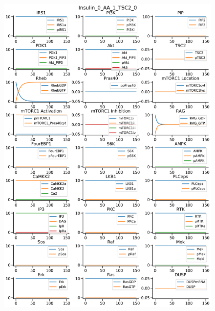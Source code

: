 \documentclass{beamer}
\begin{document}
\begin{frame}
\begin{figure}
\begin{minipage}{0.45\textwidth}
        \centering
        \includegraphics[width=\textwidth]{../simulations/ExtendedPI3KModel/validations/AAWithInsulinAndTSC2KO/Insulin_0_AA_1_TSC2_0-0.png}
    \end{minipage}
\end{figure}
\end{frame}

\end{document}
